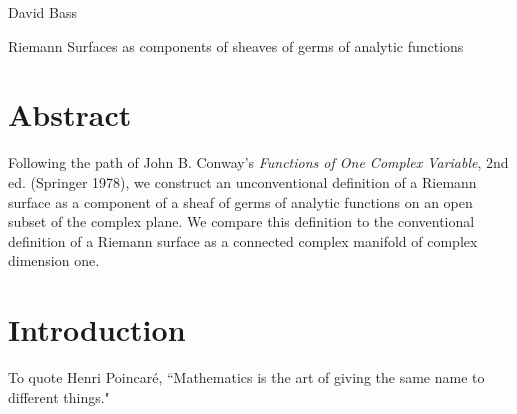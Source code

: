 \documentclass{article}
\begin{document}
\newcommand{\n}{\newline\newline}
\newcommand{\inv}{^{-1}}
\newcommand{\g}[1]{\left\langle #1\right\rangle}
\newcommand{\pd}[2]{\frac{\partial #1}{\partial #2}}
\newcommand{\mb}{\begin{pmatrix}}
\newcommand{\me}{\end{pmatrix}}
\newcommand{\lap}{\mathcal{L}}
\newcommand{\Int}{\operatorname{Int}}
\newcommand{\im}{\operatorname{im}}
\newcommand{\rk}{\operatorname{rank}}
\newcommand{\id}{\operatorname{id}}
\newcommand{\ol}{\overline}
\newcommand{\czo}{C([0, 1])}
\newcommand{\rtwo}{\mathbb{R}^2}
\newcommand{\nd}{^{(n)}}
\newcommand{\lsn}{\lim_{n\rightarrow\infty}}
\newcommand{\lsk}{\lim_{k\rightarrow\infty}}
\newcommand{\lsm}{\lim_{m\rightarrow\infty}}
\newcommand{\rbs}{\ell^\infty(\mathbb{N})}
\newcommand{\cui}{C([0, 1])}
\newcommand{\iui}{\int_0^1}
\newcommand{\ra}{\rightarrow}
\newcommand{\rs}{\mathbb{R}}
\newcommand{\ns}{\mathbb{N}}
\newcommand{\cs}{\mathbb{C}}
\newcommand{\qs}{\mathbb{Q}}
\newcommand{\fs}{\mathbb{F}}
\newcommand{\zs}{\mathbb{Z}}
\newcommand{\tl}{\triangleleft}

\theoremstyle{definition}

\newtheorem{definition}{Definition}[section]
\newtheorem{lemma}[definition]{Lemma}
\newtheorem{proposition}[definition]{Proposition}

\noindent
David Bass

\begin{center}
	Riemann Surfaces as components of sheaves of germs of analytic functions
\end{center}

\section*{Abstract}
Following the path of John B. Conway's \textit{Functions of One Complex Variable}, 2nd ed. (Springer 1978), we construct an unconventional definition of a Riemann surface as a component of a sheaf of germs of analytic functions on an open subset of the complex plane. We compare this definition to the conventional definition of a Riemann surface as a connected complex manifold of complex dimension one.

\section{Introduction}
\indent\indent 
To quote Henri Poincaré, ``Mathematics is the art of giving the same name to different things."
\end{document}
